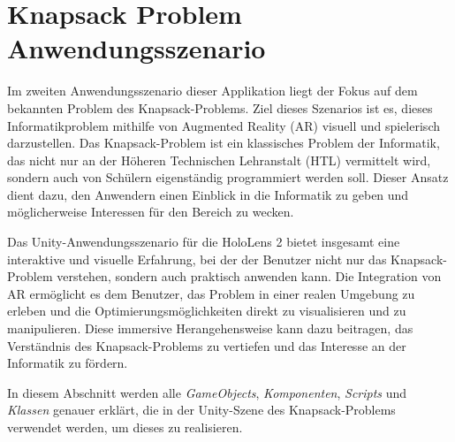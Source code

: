 \section{Knapsack Problem Anwendungsszenario}\label{sec:Scene2} 
Im zweiten Anwendungsszenario dieser Applikation liegt der Fokus auf dem bekannten Problem des Knapsack-Problems. Ziel
dieses Szenarios ist es, dieses Informatikproblem mithilfe von Augmented Reality (AR) visuell und spielerisch darzustellen.
Das Knapsack-Problem ist ein klassisches Problem der Informatik, das nicht nur an der Höheren Technischen Lehranstalt (HTL)
vermittelt wird, sondern auch von Schülern eigenständig programmiert werden soll. Dieser Ansatz dient dazu, den Anwendern
einen Einblick in die Informatik zu geben und möglicherweise Interessen für den Bereich zu wecken.

Das Unity-Anwendungsszenario für die HoloLens 2 bietet insgesamt eine interaktive und visuelle Erfahrung, bei der der
Benutzer nicht nur das Knapsack-Problem verstehen, sondern auch praktisch anwenden kann. Die Integration von AR ermöglicht
es dem Benutzer, das Problem in einer realen Umgebung zu erleben und die Optimierungsmöglichkeiten direkt zu visualisieren
und zu manipulieren. Diese immersive Herangehensweise kann dazu beitragen, das Verständnis des Knapsack-Problems zu vertiefen
und das Interesse an der Informatik zu fördern.

In diesem Abschnitt werden alle \textit{GameObjects}, \textit{Komponenten}, \textit{Scripts} und \textit{Klassen} genauer
erklärt, die in der Unity-Szene des Knapsack-Problems verwendet werden, um dieses zu realisieren.

